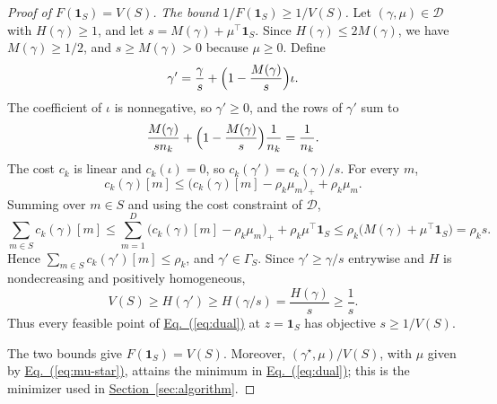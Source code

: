 \documentclass[11pt,a4paper]{article}
\newcommand{\Eqref}[1]{\hyperref[#1]{Eq.~(\ref*{#1})}}
\newcommand{\Secref}[1]{\hyperref[#1]{Section~\ref*{#1}}}
\theoremstyle{plain}
\begin{document}
\begin{proof}[Proof of $F(\mathbf1_S)=V(S)$]
\emph{The bound $1/F(\mathbf1_S)\ge1/V(S)$.}
Let $(\gamma,\mu)\in\mathcal D$ with $H(\gamma)\ge1$, and let
$s=M(\gamma)+\mu^\top\mathbf1_S$. Since $H(\gamma)\le2M(\gamma)$, we
have $M(\gamma)\ge1/2$, and $s\ge M(\gamma)>0$ because $\mu\ge0$.
Define
\[
\gamma'=\frac{\gamma}{s}+\Bigl(1-\frac{M(\gamma)}{s}\Bigr)\iota.
\]
The coefficient of $\iota$ is nonnegative, so $\gamma'\ge0$, and the
rows of $\gamma'$ sum to
\[
\frac{M(\gamma)}{sn_k}+\Bigl(1-\frac{M(\gamma)}{s}\Bigr)\frac1{n_k}
=\frac1{n_k}.
\]
The cost $c_k$ is linear and $c_k(\iota)=0$, so
$c_k(\gamma')=c_k(\gamma)/s$. For every $m$,
\[
c_k(\gamma)[m]\le\bigl(c_k(\gamma)[m]-\rho_k\mu_m\bigr)_++\rho_k\mu_m.
\]
Summing over $m\in S$ and using the cost constraint of $\mathcal D$,
\[
\sum_{m\in S}c_k(\gamma)[m]
\le\sum_{m=1}^D\bigl(c_k(\gamma)[m]-\rho_k\mu_m\bigr)_+
+\rho_k\mu^\top\mathbf1_S
\le\rho_k\bigl(M(\gamma)+\mu^\top\mathbf1_S\bigr)=\rho_ks.
\]
Hence $\sum_{m\in S}c_k(\gamma')[m]\le\rho_k$, and $\gamma'\in\Gamma_S$.
Since $\gamma'\ge\gamma/s$ entrywise and $H$ is nondecreasing and
positively homogeneous,
\[
V(S)\ge H(\gamma')\ge H(\gamma/s)=\frac{H(\gamma)}{s}\ge\frac1s.
\]
Thus every feasible point of \Eqref{eq:dual} at $z=\mathbf1_S$ has
objective $s\ge1/V(S)$.

The two bounds give $F(\mathbf1_S)=V(S)$. Moreover,
$(\gamma^\star,\mu)/V(S)$, with $\mu$ given by \Eqref{eq:mu-star},
attains the minimum in \Eqref{eq:dual}; this is the minimizer used in
\Secref{sec:algorithm}.
\end{proof}
\end{document}
